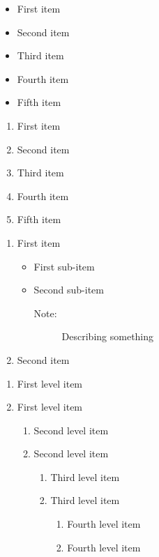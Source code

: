 \begin{itemize}
    \item First item
    \item Second item
    \item Third item
    \item Fourth item
    \item Fifth item
\end{itemize}

\begin{enumerate}
    \item First item
    \item Second item
    \item Third item
    \item Fourth item
    \item Fifth item
\end{enumerate}

\begin{enumerate}
   \item First item
   \begin{itemize}
        \item First sub-item
        \item Second sub-item
        \begin{description}
        \item[Note:] Describing something
        \end{description}
   \end{itemize}
   \item Second item
\end{enumerate}

\begin{enumerate}
    \item First level item
    \item First level item
    \begin{enumerate}
        \item Second level item
        \item Second level item
        \begin{enumerate}
            \item Third level item
            \item Third level item
            \begin{enumerate}
                \item Fourth level item
                \item Fourth level item
            \end{enumerate}
        \end{enumerate}
    \end{enumerate}
 \end{enumerate}

